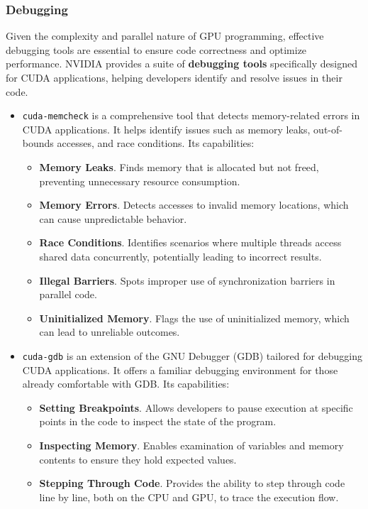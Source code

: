 \subsubsection{Debugging}

Given the complexity and parallel nature of GPU programming, effective debugging tools are essential to ensure code correctness and optimize performance. NVIDIA provides a suite of \textbf{debugging tools} specifically designed for CUDA applications, helping developers identify and resolve issues in their code.

\begin{itemize}
    \item \texttt{cuda-memcheck} is a comprehensive tool that detects memory-related errors in CUDA applications. It helps identify issues such as memory leaks, out-of-bounds accesses, and race conditions. Its capabilities:
    \begin{itemize}
        \item \textbf{Memory Leaks}. Finds memory that is allocated but not freed, preventing unnecessary resource consumption.
        \item \textbf{Memory Errors}. Detects accesses to invalid memory locations, which can cause unpredictable behavior.
        \item \textbf{Race Conditions}. Identifies scenarios where multiple threads access shared data concurrently, potentially leading to incorrect results.
        \item \textbf{Illegal Barriers}. Spots improper use of synchronization barriers in parallel code.
        \item \textbf{Uninitialized Memory}. Flags the use of uninitialized memory, which can lead to unreliable outcomes.
    \end{itemize}
    
    \item \texttt{cuda-gdb} is an extension of the GNU Debugger (GDB) tailored for debugging CUDA applications. It offers a familiar debugging environment for those already comfortable with GDB. Its capabilities:
    \begin{itemize}
        \item \textbf{Setting Breakpoints}. Allows developers to pause execution at specific points in the code to inspect the state of the program.
        \item \textbf{Inspecting Memory}. Enables examination of variables and memory contents to ensure they hold expected values.
        \item \textbf{Stepping Through Code}. Provides the ability to step through code line by line, both on the CPU and GPU, to trace the execution flow.
    \end{itemize}
\end{itemize}

